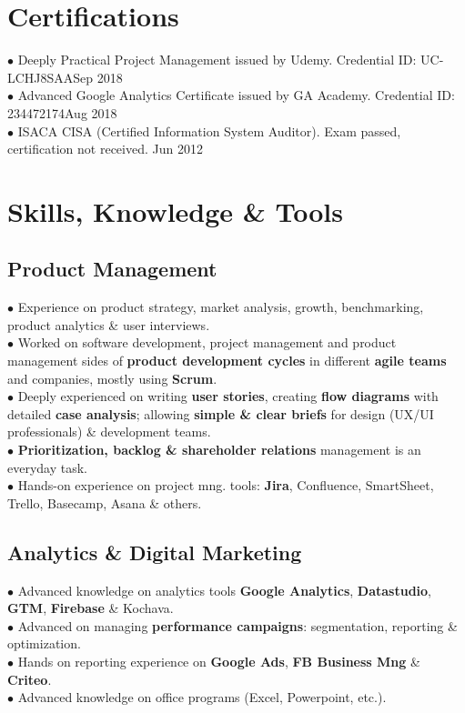 \documentclass[11pt,twoside,a4paper]{article}
\begin{document}
\section{Certifications}
  $\bullet$ Deeply Practical Project Management issued by Udemy. Credential ID: UC-LCHJ8SAA\hfill Sep 2018\\
  $\bullet$ Advanced Google Analytics Certificate issued by GA Academy. Credential ID: 234472174\hfill Aug 2018\\
  $\bullet$ ISACA CISA (Certified Information System Auditor). Exam passed, certification not received. \hfill Jun 2012

  \section{Skills, Knowledge \& Tools}
    \subsection{Product Management}
      $\bullet$ Experience on product strategy, market analysis, growth, benchmarking, product analytics \& user interviews.\\
      $\bullet$ Worked on software development, project management and product management sides of \textbf{product development cycles} in different \textbf{agile teams} and companies, mostly using \textbf{Scrum}.\\
      $\bullet$ Deeply experienced on writing \textbf{user stories}, creating \textbf{flow diagrams} with detailed \textbf{case analysis}; allowing \textbf{simple \& clear briefs} for design (UX/UI professionals) \& development teams.\\
        $\bullet$ \textbf{Prioritization, backlog \& shareholder relations} management is an everyday task.\\
      $\bullet$ Hands-on experience on project mng. tools: \textbf{Jira}, Confluence, SmartSheet, Trello, Basecamp, Asana \& others.
    \subsection{Analytics \& Digital Marketing}
      $\bullet$ Advanced knowledge on analytics tools \textbf{Google Analytics}, \textbf{Datastudio}, \textbf{GTM}, \textbf{Firebase} \& Kochava.\\
      $\bullet$ Advanced on managing \textbf{performance campaigns}: segmentation, reporting \& optimization.\\
      $\bullet$ Hands on reporting experience on \textbf{Google Ads}, \textbf{FB Business Mng} \& \textbf{Criteo}.\\
      $\bullet$ Advanced knowledge on office programs (Excel, Powerpoint, etc.).
\end{document}
